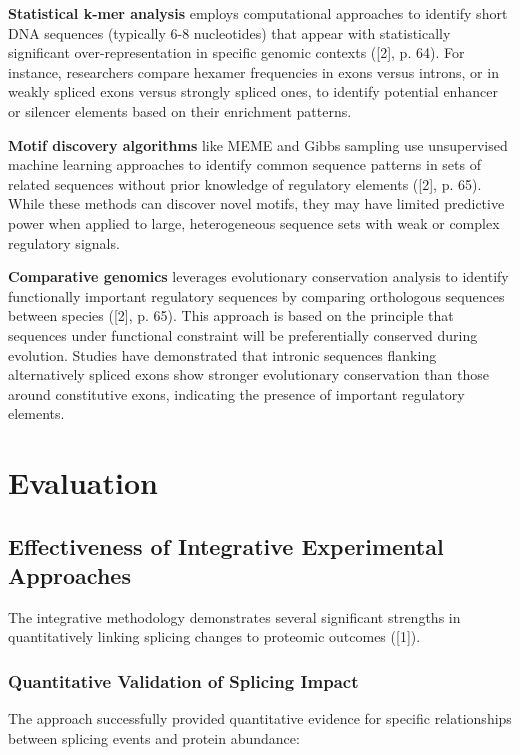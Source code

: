\documentclass[12pt,a4paper]{article}
\begin{document}
\textbf{Statistical k-mer analysis} employs computational approaches to identify short DNA sequences (typically 6-8 nucleotides) that appear with statistically significant over-representation in specific genomic contexts ([2], p. 64). For instance, researchers compare hexamer frequencies in exons versus introns, or in weakly spliced exons versus strongly spliced ones, to identify potential enhancer or silencer elements based on their enrichment patterns.

\textbf{Motif discovery algorithms} like MEME and Gibbs sampling use unsupervised machine learning approaches to identify common sequence patterns in sets of related sequences without prior knowledge of regulatory elements ([2], p. 65). While these methods can discover novel motifs, they may have limited predictive power when applied to large, heterogeneous sequence sets with weak or complex regulatory signals.

\textbf{Comparative genomics} leverages evolutionary conservation analysis to identify functionally important regulatory sequences by comparing orthologous sequences between species ([2], p. 65). This approach is based on the principle that sequences under functional constraint will be preferentially conserved during evolution. Studies have demonstrated that intronic sequences flanking alternatively spliced exons show stronger evolutionary conservation than those around constitutive exons, indicating the presence of important regulatory elements.

\section{Evaluation}

\subsection{Effectiveness of Integrative Experimental Approaches}

The integrative methodology demonstrates several significant strengths in quantitatively linking splicing changes to proteomic outcomes ([1]).

\subsubsection{Quantitative Validation of Splicing Impact}

The approach successfully provided quantitative evidence for specific relationships between splicing events and protein abundance:
\end{document}

